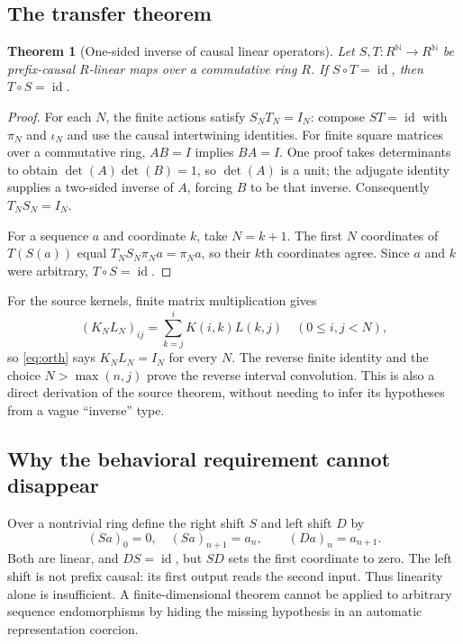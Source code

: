 \documentclass[11pt,letterpaper]{article}
\newcommand{\N}{\mathbb N}
\newcommand{\id}{\operatorname{id}}
\newtheorem{theorem}{Theorem}[section]
\theoremstyle{definition}
\theoremstyle{remark}
\begin{document}
\subsection{The transfer theorem}
\begin{theorem}[One-sided inverse of causal linear operators]\label{thm:causal}
Let $S,T:R^{\N}\to R^{\N}$ be prefix-causal $R$-linear maps over a commutative
ring $R$. If $S\circ T=\id$, then $T\circ S=\id$.
\end{theorem}
\begin{proof}
For each $N$, the finite actions satisfy $S_NT_N=I_N$: compose
$S T=\id$ with $\pi_N$ and $\iota_N$ and use the causal intertwining identities.
For finite square matrices over a commutative ring, $AB=I$ implies $BA=I$.
One proof takes determinants to obtain
$\det(A)\det(B)=1$, so $\det(A)$ is a unit; the adjugate identity supplies a
two-sided inverse of $A$, forcing $B$ to be that inverse. Consequently
$T_NS_N=I_N$.

For a sequence $a$ and coordinate $k$, take $N=k+1$. The first $N$ coordinates
of $T(S(a))$ equal $T_NS_N\pi_Na=\pi_Na$, so their $k$th coordinates agree.
Since $a$ and $k$ were arbitrary, $T\circ S=\id$.
\end{proof}
For the source kernels, finite matrix multiplication gives
\[
 (K_NL_N)_{ij}=\sum_{k=j}^{i}K(i,k)L(k,j)
               \quad(0\le i,j<N),
\]
so \eqref{eq:orth} says $K_NL_N=I_N$ for every $N$. The reverse finite identity
and the choice $N>\max(n,j)$ prove the reverse interval convolution. This is
also a direct derivation of the source theorem, without needing to infer its
hypotheses from a vague ``inverse'' type.

\subsection{Why the behavioral requirement cannot disappear}
Over a nontrivial ring define the right shift $S$ and left shift $D$ by
\[
 (Sa)_0=0,\quad(Sa)_{n+1}=a_n,\qquad(Da)_n=a_{n+1}.
\]
Both are linear, and $D S=\id$, but $S D$ sets the first coordinate to zero.
The left shift is not prefix causal: its first output reads the second input.
Thus linearity alone is insufficient. A finite-dimensional theorem cannot be
applied to arbitrary sequence endomorphisms by hiding the missing hypothesis
in an automatic representation coercion.
\end{document}
